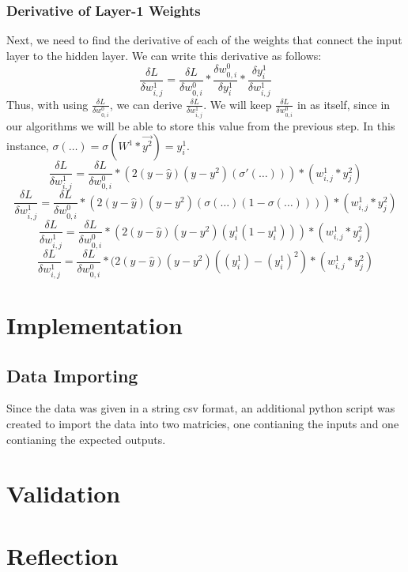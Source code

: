 \documentclass[10pt]{article}
\begin{document}
\subsubsection{Derivative of Layer-1 Weights}
Next, we need to find the derivative of each of the weights that connect the input layer to the hidden layer. We can write this derivative as follows:
$$\frac{\delta L}{\delta w^1_{i,j}} = \frac{\delta L}{\delta w^0_{0,i}} * \frac{\delta w^0_{0,i}}{\delta y^1_i} * \frac{\delta y^1_i}{\delta w^1_{i,j}}$$
Thus, with using $\frac{\delta L}{\delta w^0_{0,i}}$, we can derive $\frac{\delta L}{\delta w^1_{i,j}}$. We will keep $\frac{\delta L}{\delta w^0_{0,i}}$ in as itself, since in our algorithms we will be able to store this value from the previous step. In this instance, $\sigma(\ldots) = \sigma(W^1 * \vec{y^2}) = y^1_i$.
$$\frac{\delta L}{\delta w^1_{i,j}} = \frac{\delta L}{\delta w^0_{0,i}} * (2(y-\hat{y})(y - y^2)(\sigma'(\ldots))) * (w^1_{i,j} * y^2_{j})$$
$$\frac{\delta L}{\delta w^1_{i,j}} = \frac{\delta L}{\delta w^0_{0,i} }* (2(y - \hat{y})(y - y^2)(\sigma(\ldots)(1 - \sigma(\ldots)))) * (w^1_{i,j} * y^2_{j})$$
$$\frac{\delta L}{\delta w^1_{i,j}} = \frac{\delta L}{\delta w^0_{0,i}} * (2(y - \hat{y})(y - y^2)(y^1_i (1 - y^1_i))) * (w^1_{i,j} * y^2_{j})$$
$$\frac{\delta L}{\delta w^1_{i,j}} = \frac{\delta L}{\delta w^0_{0,i}} * (2(y - \hat{y})(y - y^2)((y^1_i) - (y^1_i)^2) * (w^1_{i,j} * y^2_{j})$$


\section{Implementation}
\subsection{Data Importing}
Since the data was given in a string csv format, an additional python script was created to import the data into two matricies, one contianing the inputs and one contianing the expected outputs.
\section{Validation}
\section{Reflection}
\end{document}
